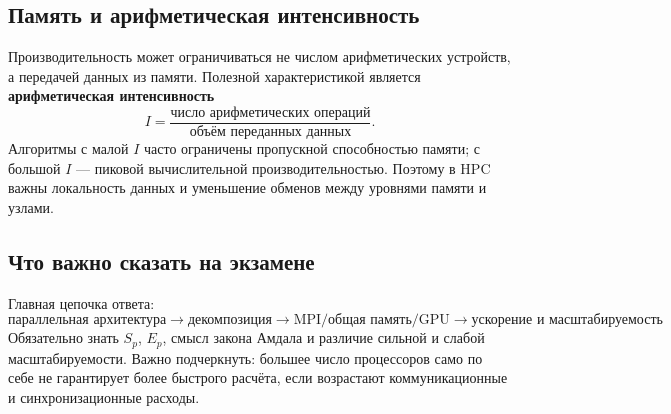 \subsection{Память и арифметическая интенсивность}

Производительность может ограничиваться не числом арифметических устройств, а передачей данных из памяти. Полезной характеристикой является \textbf{арифметическая интенсивность}
\[
I=\frac{\text{число арифметических операций}}{\text{объём переданных данных}}.
\]
Алгоритмы с малой $I$ часто ограничены пропускной способностью памяти; с большой $I$ --- пиковой вычислительной производительностью. Поэтому в HPC важны локальность данных и уменьшение обменов между уровнями памяти и узлами.

\subsection{Что важно сказать на экзамене}

Главная цепочка ответа:
\[
\boxed{\text{параллельная архитектура}
\rightarrow
\text{декомпозиция}
\rightarrow
\text{MPI/общая память/GPU}
\rightarrow
\text{ускорение и масштабируемость}}.
\]
Обязательно знать $S_p$, $E_p$, смысл закона Амдала и различие сильной и слабой масштабируемости. Важно подчеркнуть: большее число процессоров само по себе не гарантирует более быстрого расчёта, если возрастают коммуникационные и синхронизационные расходы.

\newpage
